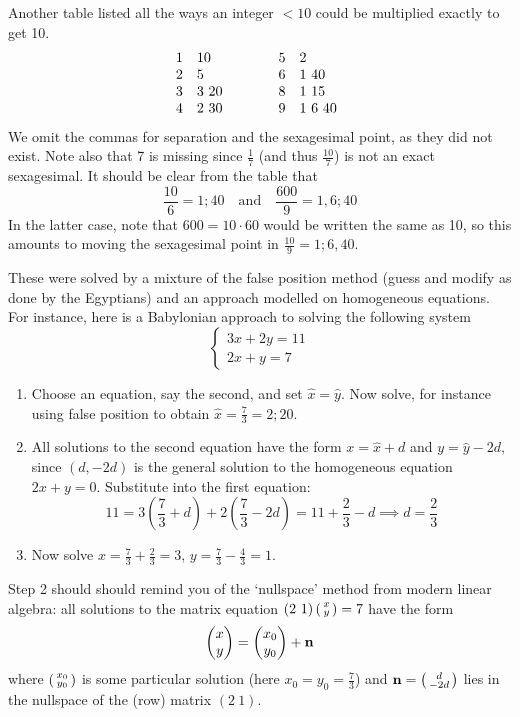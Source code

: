Another table listed all the ways an integer $<10$ could be multiplied exactly to get 10.
\[\begin{array}{@{}cl@{\qquad\qquad}cl}
1&10&5&2\\
2&5&6&1\ 40\\
3&3\ 20&8&1\ 15\\
4&2\ 30&9&1\ 6\ 40
\end{array}\]
We omit the commas for separation and the sexagesimal point, as they did not exist.  Note also that 7 is missing since $\frac 17$ (and thus $\frac{10}7$) is not an exact sexagesimal. It should be clear from the table that
\[\frac{10}6=1;40\quad\text{and}\quad \frac{600}9=1,6;40
\]
In the latter case, note that $600=10\cdot 60$ would be written the same as 10, so this amounts to moving the sexagesimal point in $\frac{10}9=1;6,40$.

\vfil\goodbreak



These were solved by a mixture of the false position method (guess and modify as done by the Egyptians) and an approach modelled on homogeneous equations. For instance, here is a Babylonian approach to solving the following system
\[\begin{cases}
3x+2y=11\\
2x+y=7
\end{cases}\]
\begin{enumerate}
  \item Choose an equation, say the second, and set $\hat x=\hat y$. Now solve, for instance using false position to obtain $\hat x=\frac 73=2;20$.
  \item All solutions to the second equation have the form $x=\hat x+d$ and $y=\hat y-2d$, since $(d,-2d)$ is the general solution to the homogeneous equation $2x+y=0$. Substitute into the first equation:
  \[11=3\left(\frac 73+d\right)+2\left(\frac 73-2d\right)=11+\frac 23-d\implies d=\frac 23\]
  \item Now solve $x=\frac 73+\frac 23=3$, $y=\frac 73-\frac 43=1$.
\end{enumerate}\smallskip

Step 2 should should remind you of the `nullspace' method from modern linear algebra: all solutions to the matrix equation $(2\ 1)\left(\begin{smallmatrix}x\\y\end{smallmatrix}\right)=7$ have the form
\[\begin{pmatrix}x\\y\end{pmatrix}=\begin{pmatrix}x_0\\y_0\end{pmatrix}+{\mathbf{n}}\]
where $\left(\begin{smallmatrix}x_0\\y_0\end{smallmatrix}\right)$ is some particular solution (here $x_0=y_0=\frac 73$) and ${\mathbf{n}}=\left(\begin{smallmatrix}d\\-2d\end{smallmatrix}\right)$ lies in the nullspace of the (row) matrix $(2\ 1)$.


